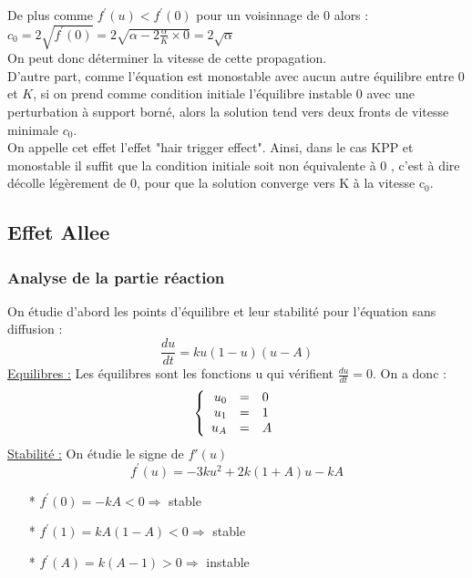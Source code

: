 \documentclass[a4paper,11pt]{article}
\begin{document}
    De plus comme $ f^\prime(u)< f^\prime(0)$ pour un voisinnage de $0$ alors : \\
    $c_0=2 \sqrt{f^\prime(0)}= 2 \sqrt{\alpha - 2 \frac{\alpha}{K} \times 0} = 2 \sqrt{\alpha}$\\
    On peut donc déterminer la vitesse de cette propagation. \\
    
    
        D'autre part, comme l'équation est monostable avec aucun autre équilibre entre $0$ et $K$, si on prend comme condition initiale l'équilibre instable $0$ avec une perturbation à support borné, alors la solution tend vers deux fronts de vitesse minimale $c_0$. \\
		On appelle cet effet l'effet "hair trigger effect". Ainsi, dans le cas KPP et monostable il suffit que
		la condition initiale soit non équivalente à 0 , c'est à dire décolle légèrement de 0, pour que la solution
		converge vers K à la vitesse c$_0$. 
		
		
		
\subsection{Effet Allee}
\subsubsection{Analyse de la partie réaction}
On étudie d'abord les points d'équilibre et leur stabilité pour l'équation sans diffusion : $$\frac{du}{dt}=ku(1-u)(u-A)$$
\underline{Equilibres :} Les équilibres sont les fonctions u qui vérifient $\frac{du}{dt}=0$. On a donc :
\[
\left\{
\begin{array}{r c l}
u_0 &=& 0\\
u_1 &=& 1\\
u_A &=& A\\
\end{array}
\right.
\]
\underline{Stabilité :} On étudie le signe de $f'(u)$ 
$$f^\prime(u)= -3ku^2 + 2k(1+A)u-kA$$

\begin{itemize}
    	\item[*] $f^\prime(0)=-kA <0 \Rightarrow $ stable
        \item[*] $f^\prime(1)=kA(1-A) <0 \Rightarrow $ stable
        \item[*] $f^\prime(A)=k(A-1) >0 \Rightarrow $ instable
	\end{itemize}
\end{document}
